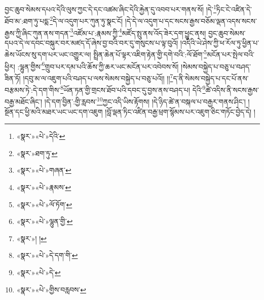 བྱང་ཆུབ་སེམས་དཔའ་དེའི་ལུས་ཀྱང་དེ་དང་འཚམ་ཞིང་དེའི་རྐྱེན་དུ་འབབ་པར་གནས་སོ། །དེ་\footnote{«སྣར་»«པེ་»དེའི་}ཏིང་ངེ་འཛིན་དེ་ཐོབ་མ་:ཐག་ཏུ་པདྨ་\footnote{«སྣར་»ཐག་ཏུ་}དེ་ལ་འདུག་པར་ཀུན་ཏུ་སྣང་ངོ། །དེ་དེ་ལ་འདུག་པ་དང་སངས་རྒྱས་བཅོམ་ལྡན་འདས་སངས་རྒྱས་ཀྱི་ཞིང་ཀུན་ནས་གདན་\footnote{«སྣར་»«པེ་»གཞན་}འཛོམ་པ་:རྣམས་ཀྱི་\footnote{«སྣར་»«པེ་»རྣམས་}མཛོད་སྤུ་ནས་འོད་ཟེར་དག་ཕྱུང་ནས། བྱང་ཆུབ་སེམས་དཔའ་དེ་ལ་དབང་བསྐུར་བར་མཛད་དོ་ཞེས་བྱ་བའི་བར་དུ་གསུངས་པ་ལྟ་བུའོ། །འདིའི་ཡེ་ཤེས་ཀྱི་ཕ་རོལ་ཏུ་ཕྱིན་པ་ཆེས་ཡོངས་སུ་དག་པར་ཡང་འགྱུར་ལ། སྤྲིན་ཆེན་པོ་ལྟར་འཇིག་རྟེན་གྱི་དགེ་བའི་:ལོ་ཐོག་\footnote{«སྣར་»«པེ་»ལོ་ཏོག་}མངོན་པར་སྤེལ་བའི་ཕྱིར། :ལྷུན་གྱིས་\footnote{«སྣར་»«པེ་»ལྷུན་གྱི་}གྲུབ་པར་དམ་པའི་ཆོས་ཀྱི་ཆར་ཡང་མངོན་པར་འབེབས་སོ། །སེམས་བསྐྱེད་པ་བཅུ་པ་བཤད་ཟིན་ཏོ། །དབུ་མ་ལ་འཇུག་པའི་བཤད་པ་ལས་སེམས་བསྐྱེད་པ་བཅུ་པའོ།། །།\footnote{«སྣར་»། །}ད་ནི་སེམས་བསྐྱེད་པ་དང་པོ་ནས་བརྩམས་ཏེ་:དེ་དག་གིས་\footnote{«སྣར་»«པེ་»དེ་དག་གི་}ཡོན་ཏན་གྱི་གྲངས་ཐོབ་པའི་དབང་དུ་བྱས་ནས་བཤད་པ། དེའི་\footnote{«སྣར་»«པེ་»དེ་}ཚེ་འདིས་ནི་སངས་རྒྱས་བརྒྱ་མཐོང་ཞིང་། །དེ་དག་བྱིན་:གྱི་རླབས་\footnote{«སྣར་»«པེ་»གྱིས་བརླབས་}ཀྱང་འདི་ཡིས་རྟོགས། །དེ་ཉིད་ཚེ་ན་བསྐལ་པ་བརྒྱར་གནས་ཤིང་། །སྔོན་དང་ཕྱི་མའི་མཐར་ཡང་ཡང་དག་འཇུག །བློ་ལྡན་ཏིང་འཛིན་བརྒྱ་ཕྲག་སྙོམས་པར་འཇུག་ཅིང་གཏོང་བྱེད་དེ། །
